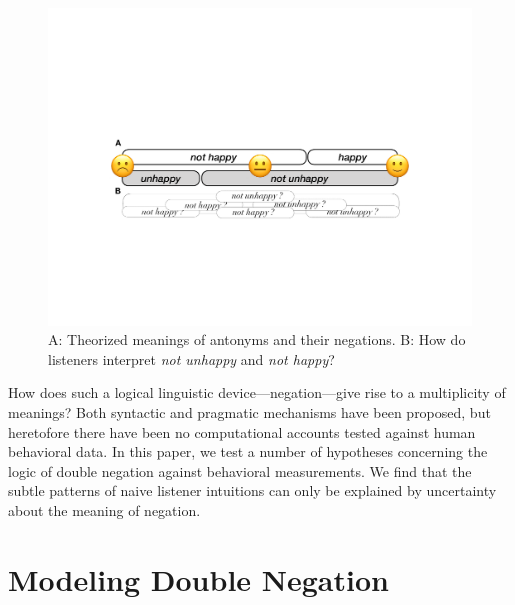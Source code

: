 \documentclass[floatsintext,doc]{apa6}
\begin{document}
\begin{figure}[b]
\centering \includegraphics{figs/happy-scale-2}  
\caption{A: Theorized meanings of antonyms and their negations. B: How do listeners interpret \emph{not unhappy} and \emph{not happy}? }\label{fig:happy-scale}
\end{figure}

How does such a logical linguistic device---negation---give rise to a multiplicity of meanings?
Both syntactic \cite{Cable2017} and pragmatic \cite{Rett2014:eval} mechanisms have been proposed, but heretofore there have been no computational accounts tested against human behavioral data.
In this paper, we test a number of hypotheses concerning the logic of double negation against behavioral measurements. 
We find that the subtle patterns of naive listener intuitions can only be explained by uncertainty about the meaning of negation.

\section{Modeling Double Negation}
\end{document}
